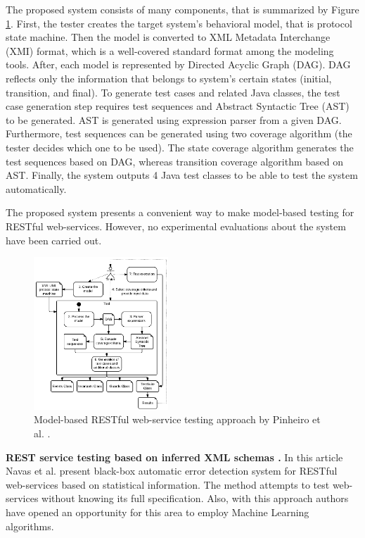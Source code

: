 \documentclass[english]{tktltiki}
\begin{document}
The proposed system consists of many components, that is summarized by Figure \ref{fig:uml_system}. First, the tester creates the target system's behavioral model, that is protocol state machine. Then the model is converted to XML Metadata Interchange (XMI) format, which is a well-covered standard format among the modeling tools. After, each model is represented by Directed Acyclic Graph (DAG). DAG reflects only the information that belongs to system's certain states (initial, transition, and final). To generate test cases and related Java classes, the test case generation step requires test sequences and Abstract Syntactic Tree (AST) to be generated. AST is generated using expression parser from a given DAG. Furthermore, test sequences can be generated using two coverage algorithm (the tester decides which one to be used). The state coverage algorithm generates the test sequences based on DAG, whereas transition coverage algorithm based on AST. Finally, the system outputs 4 Java test classes to be able to test the system automatically.

The proposed system presents a convenient way to make model-based testing for RESTful web-services. However, no experimental evaluations about the system have been carried out.

\begin{figure}[h]
	\begin{center}
		\includegraphics[width=0.45\textwidth]{images/uml_system.png}
		\caption{ Model-based RESTful web-service testing approach by Pinheiro et al. \cite{pinheiro2013model}. }
		\label{fig:uml_system}
	\end{center}
\end{figure}

\textbf{REST service testing based on inferred XML schemas \cite{navas2014rest}.} In this article Navas et al. \cite{navas2014rest} present black-box automatic error detection system for RESTful web-services based on statistical information. The method attempts to test web-services without knowing its full specification. Also, with this approach authors have opened an opportunity for this area to employ Machine Learning algorithms.
\end{document}
